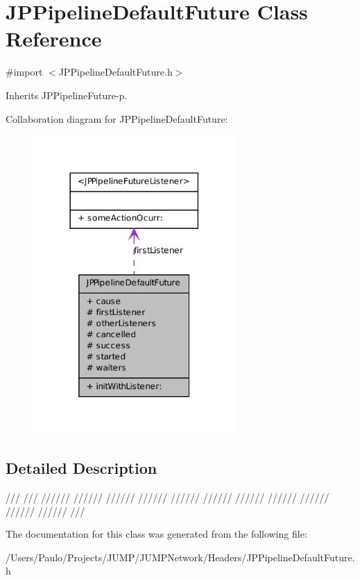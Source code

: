 \hypertarget{a00020}{
\section{JPPipelineDefaultFuture Class Reference}
\label{a00020}
}


{\ttfamily \#import $<$JPPipelineDefaultFuture.h$>$}



Inherits JPPipelineFuture-\/p.



Collaboration diagram for JPPipelineDefaultFuture:\nopagebreak
\begin{figure}[H]
\begin{center}
\leavevmode
\includegraphics[width=218pt]{a00122}
\end{center}
\end{figure}


\subsection{Detailed Description}
/// /// ////// ////// ////// ////// ////// ////// ////// ////// ////// ////// ////// /// 

The documentation for this class was generated from the following file:\begin{DoxyCompactItemize}
\item 
/Users/Paulo/Projects/JUMP/JUMPNetwork/Headers/JPPipelineDefaultFuture.h\end{DoxyCompactItemize}
